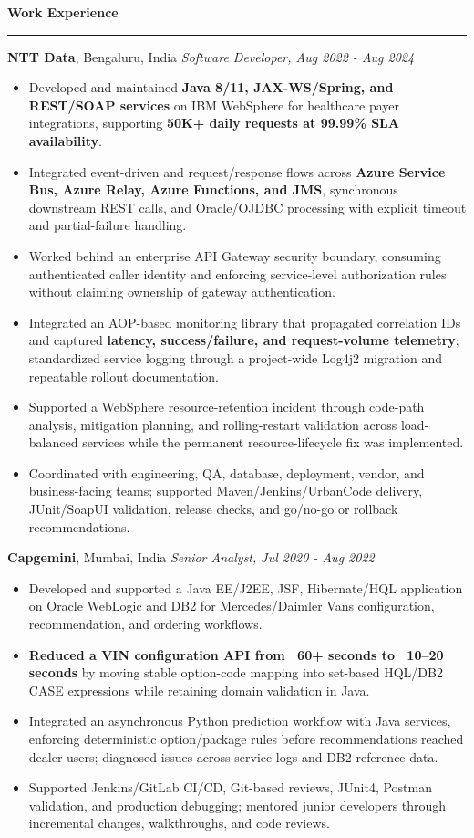 \documentclass[11pt,letterpaper]{article}
\newcommand{\ressection}[1]{\Needspace{6\baselineskip}\vspace{8pt}\par\textbf{#1}\par\vspace{2pt}\hrule\vspace{5pt}}
\begin{document}
\ressection{Work Experience}
\textbf{NTT Data}, Bengaluru, India \hfill \textit{Software Developer, Aug 2022 - Aug 2024}
\begin{itemize}
  \item Developed and maintained \textbf{Java 8/11, JAX-WS/Spring, and REST/SOAP services} on IBM WebSphere for healthcare payer integrations, supporting \textbf{50K+ daily requests at 99.99\% SLA availability}.
  \item Integrated event-driven and request/response flows across \textbf{Azure Service Bus, Azure Relay, Azure Functions, and JMS}, synchronous downstream REST calls, and Oracle/OJDBC processing with explicit timeout and partial-failure handling.
  \item Worked behind an enterprise API Gateway security boundary, consuming authenticated caller identity and enforcing service-level authorization rules without claiming ownership of gateway authentication.
  \item Integrated an AOP-based monitoring library that propagated correlation IDs and captured \textbf{latency, success/failure, and request-volume telemetry}; standardized service logging through a project-wide Log4j2 migration and repeatable rollout documentation.
  \item Supported a WebSphere resource-retention incident through code-path analysis, mitigation planning, and rolling-restart validation across load-balanced services while the permanent resource-lifecycle fix was implemented.
  \item Coordinated with engineering, QA, database, deployment, vendor, and business-facing teams; supported Maven/Jenkins/UrbanCode delivery, JUnit/SoapUI validation, release checks, and go/no-go or rollback recommendations.
\end{itemize}
\textbf{Capgemini}, Mumbai, India \hfill \textit{Senior Analyst, Jul 2020 - Aug 2022}
\begin{itemize}
  \item Developed and supported a Java EE/J2EE, JSF, Hibernate/HQL application on Oracle WebLogic and DB2 for Mercedes/Daimler Vans configuration, recommendation, and ordering workflows.
  \item \textbf{Reduced a VIN configuration API from ~60+ seconds to ~10--20 seconds} by moving stable option-code mapping into set-based HQL/DB2 CASE expressions while retaining domain validation in Java.
  \item Integrated an asynchronous Python prediction workflow with Java services, enforcing deterministic option/package rules before recommendations reached dealer users; diagnosed issues across service logs and DB2 reference data.
  \item Supported Jenkins/GitLab CI/CD, Git-based reviews, JUnit4, Postman validation, and production debugging; mentored junior developers through incremental changes, walkthroughs, and code reviews.
\end{itemize}
\end{document}
